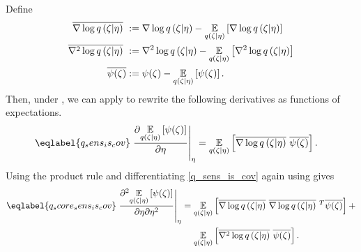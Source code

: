 \begin{lem}
%
Define
%
\begin{align*}
%
\lqgradbar{\zeta \vert \eta} :={}& \lqgrad{\zeta \vert \eta}
  - \expect{\q(\zeta \vert \eta)}{\lqgrad{\zeta \vert \eta}} \\
\lqhessbar{\zeta \vert \eta} :={}& \lqhess{\zeta \vert \eta}
 - \expect{\q(\zeta \vert \eta)}{\lqhess{\zeta \vert \eta}} \\
\overline{\psi(\zeta)} :={}& \psi(\zeta)
 - \expect{\q(\zeta \vert \eta)}{\psi(\zeta)}.
%
\end{align*}
%
Then, under , we can apply \citet[Theorem
1]{giordano:2018:covariances} to rewrite the following derivatives as functions
of expectations.
%
\begin{align}\eqlabel{q_sens_is_cov}
%
\fracat{\partial \expect{\q(\zeta \vert \eta)}
              {\psi(\zeta)}}{\partial \eta}{\eta} ={}&
\expect{\q(\zeta \vert \eta)}
       {\lqgradbar{\zeta \vert \eta} \overline{\psi(\zeta)}}.
%
\end{align}
%
Using the product rule and differentiating \eqref{q_sens_is_cov} again using
gives
%
\begin{align}\eqlabel{q_score_sens_is_cov}
%
\fracat{\partial^2 \expect{\q(\zeta \vert \eta)}
              {\psi(\zeta)}}{\partial \eta \partial \eta^2}{\eta} ={}&
\expect{\q(\zeta \vert \eta)}
       {\lqgradbar{\zeta \vert \eta} \lqgradbar{\zeta \vert \eta}^T
        \overline{\psi(\zeta)} } +
\nonumber\\&
\expect{\q(\zeta \vert \eta)}{
       \lqhessbar{\zeta \vert \eta}
        \overline{\psi(\zeta)}
       }.
%
\end{align}
%
\end{lem}



